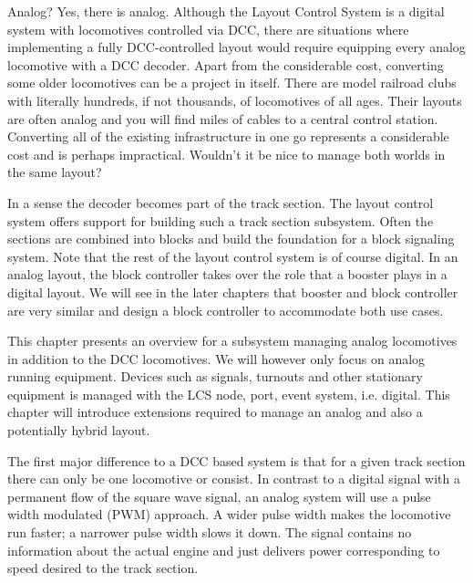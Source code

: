 
Analog? Yes, there is analog. Although the Layout Control System is a digital system with locomotives controlled via DCC, there are situations where implementing a fully DCC-controlled layout would require equipping every analog locomotive with a DCC decoder. Apart from the considerable cost, converting some older locomotives can be a project in itself. There are model railroad clubs with literally hundreds, if not thousands, of locomotives of all ages. Their layouts are often analog and you will find miles of cables to a central control station. Converting all of the existing infrastructure in one go represents a considerable cost and is perhaps impractical. Wouldn't it be nice to manage both worlds in the same layout?

In a sense the decoder becomes part of the track section. The layout control system offers support for building such a track section subsystem. Often the sections are combined into blocks and build the foundation for a block signaling system. Note that the rest of the layout control system is of course digital. In an analog layout, the block controller takes over the role that a booster plays in a digital layout. We will see in the later chapters that booster and block controller are very similar and design a block controller to accommodate both use cases.

This chapter presents an overview for a subsystem managing analog locomotives in addition to the DCC locomotives. We will however only focus on analog running equipment. Devices such as signals, turnouts and other stationary equipment is managed with the LCS node, port, event system, i.e. digital. This chapter will introduce extensions required to manage an analog and also a potentially hybrid layout.


The first major difference to a DCC based system is that for a given track section there can only be one locomotive or consist. In contrast to a digital signal with a permanent flow of the square wave signal, an analog system will use a pulse width modulated (PWM) approach. A wider pulse width makes the locomotive run faster; a narrower pulse width slows it down. The signal contains no information about the actual engine and just delivers power corresponding to speed desired to the track section.

